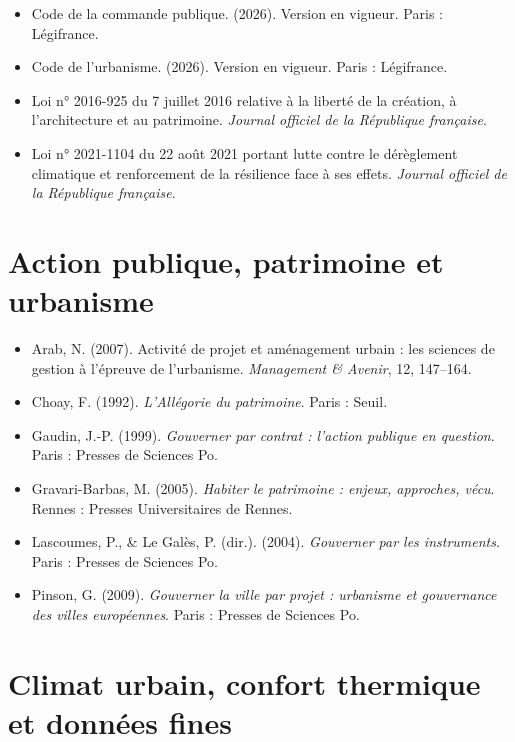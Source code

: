 \documentclass[11pt,a4paper]{report}
\begin{document}
\begin{itemize}
  \item Code de la commande publique. (2026). Version en vigueur. Paris : Légifrance.
  \item Code de l'urbanisme. (2026). Version en vigueur. Paris : Légifrance.
  \item Loi n° 2016-925 du 7 juillet 2016 relative à la liberté de la création, à l'architecture et au patrimoine. \emph{Journal officiel de la République française}.
  \item Loi n° 2021-1104 du 22 août 2021 portant lutte contre le dérèglement climatique et renforcement de la résilience face à ses effets. \emph{Journal officiel de la République française}.
\end{itemize}

\section*{Action publique, patrimoine et urbanisme}

\begin{itemize}
  \item Arab, N. (2007). Activité de projet et aménagement urbain : les sciences de gestion à l'épreuve de l'urbanisme. \emph{Management \& Avenir}, 12, 147--164.
  \item Choay, F. (1992). \emph{L'Allégorie du patrimoine}. Paris : Seuil.
  \item Gaudin, J.-P. (1999). \emph{Gouverner par contrat : l'action publique en question}. Paris : Presses de Sciences Po.
  \item Gravari-Barbas, M. (2005). \emph{Habiter le patrimoine : enjeux, approches, vécu}. Rennes : Presses Universitaires de Rennes.
  \item Lascoumes, P., \& Le Galès, P. (dir.). (2004). \emph{Gouverner par les instruments}. Paris : Presses de Sciences Po.
  \item Pinson, G. (2009). \emph{Gouverner la ville par projet : urbanisme et gouvernance des villes européennes}. Paris : Presses de Sciences Po.
\end{itemize}

\section*{Climat urbain, confort thermique et données fines}
\end{document}
